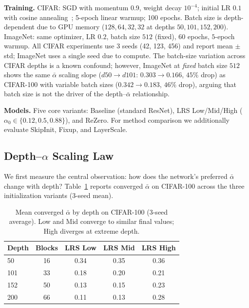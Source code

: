 \documentclass{bmvc2k}
\begin{document}
\textbf{Training.} CIFAR: SGD with momentum 0.9, weight decay $10^{-4}$; initial LR $0.1$ with cosine annealing~\cite{loshchilov2017sgdr}; 5-epoch linear warmup; 100 epochs. Batch size is depth-dependent due to GPU memory ($128, 64, 32, 32$ at depths $50, 101, 152, 200$). ImageNet: same optimizer, LR $0.2$, batch size $512$ (fixed), $60$ epochs, $5$-epoch warmup. All CIFAR experiments use 3 seeds (42, 123, 456) and report mean $\pm$ std; ImageNet uses a single seed due to compute. The batch-size variation across CIFAR depths is a known confound; however, ImageNet at \emph{fixed} batch size $512$ shows the same $\bar{\alpha}$ scaling slope ($d50 \to d101$: $0.303 \to 0.166$, $45\%$ drop) as CIFAR-100 with variable batch sizes ($0.342 \to 0.183$, $46\%$ drop), arguing that batch size is not the driver of the depth--$\bar{\alpha}$ relationship.

\textbf{Models.} Five core variants: Baseline (standard ResNet), LRS Low/Mid/High ($\alpha_0 \in \{0.12, 0.5, 0.88\}$), and ReZero. For method comparison we additionally evaluate SkipInit, Fixup, and LayerScale.

\subsection{Depth--$\alpha$ Scaling Law}
\label{sec:alpha_convergence}

We first measure the central observation: how does the network's preferred $\bar{\alpha}$ change with depth? Table~\ref{tab:depth_alpha} reports converged $\bar{\alpha}$ on CIFAR-100 across the three initialization variants (3-seed mean).

\begin{table}[!ht]
\centering
\small
\caption{Mean converged $\bar{\alpha}$ by depth on CIFAR-100 (3-seed average). Low and Mid converge to similar final values; High diverges at extreme depth.}
\label{tab:depth_alpha}
\begin{tabular}{lcccc}
\toprule
\textbf{Depth} & \textbf{Blocks} & \textbf{LRS Low} & \textbf{LRS Mid} & \textbf{LRS High} \\
\midrule
50  & 16 & 0.34 & 0.35 & 0.36 \\
101 & 33 & 0.18 & 0.20 & 0.21 \\
152 & 50 & 0.13 & 0.15 & 0.23 \\
200 & 66 & 0.11 & 0.13 & 0.28 \\
\bottomrule
\end{tabular}
\end{table}
\end{document}
